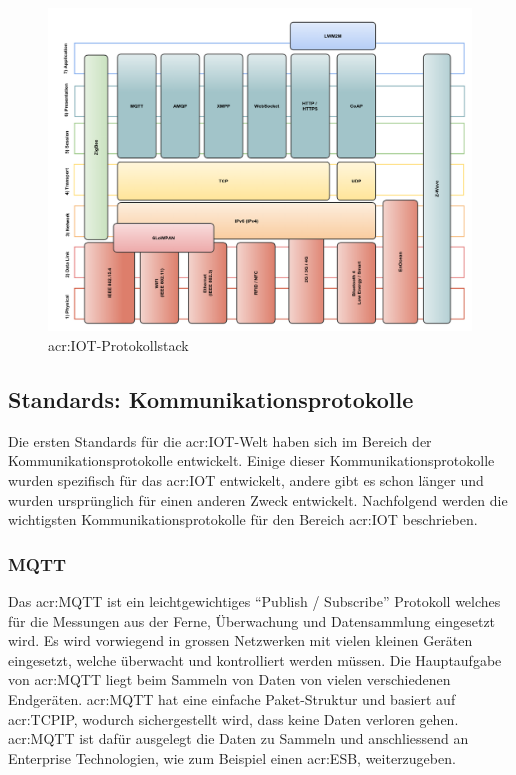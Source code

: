 \pagebreak
\begin{figure}[H]
  \centering
  \includegraphics[width=16cm]{./images/IoT-Protokollstack}
  \caption{\gls{acr:IOT}-Protokollstack}
\end{figure}


\subsection{Standards: Kommunikationsprotokolle}
Die ersten Standards für die \gls{acr:IOT}-Welt haben sich im Bereich der Kommunikationsprotokolle entwickelt. Einige dieser Kommunikationsprotokolle wurden spezifisch für das \gls{acr:IOT} entwickelt, andere gibt es schon länger und wurden ursprünglich für einen anderen Zweck entwickelt. Nachfolgend werden die wichtigsten Kommunikationsprotokolle für den Bereich \gls{acr:IOT} beschrieben.


\subsubsection{MQTT}
Das \gls{acr:MQTT} ist ein leichtgewichtiges "`Publish / Subscribe"' Protokoll welches für die Messungen aus der Ferne, Überwachung und Datensammlung eingesetzt wird. Es wird vorwiegend in grossen Netzwerken mit vielen kleinen Geräten eingesetzt, welche überwacht und kontrolliert werden müssen. Die Hauptaufgabe von \gls{acr:MQTT} liegt beim Sammeln von Daten von vielen verschiedenen Endgeräten. \gls{acr:MQTT} hat eine einfache Paket-Struktur und basiert auf \gls{acr:TCPIP}, wodurch sichergestellt wird, dass keine Daten verloren gehen. \gls{acr:MQTT} ist dafür ausgelegt die Daten zu Sammeln und anschliessend an Enterprise Technologien, wie zum Beispiel einen \gls{acr:ESB}, weiterzugeben.

